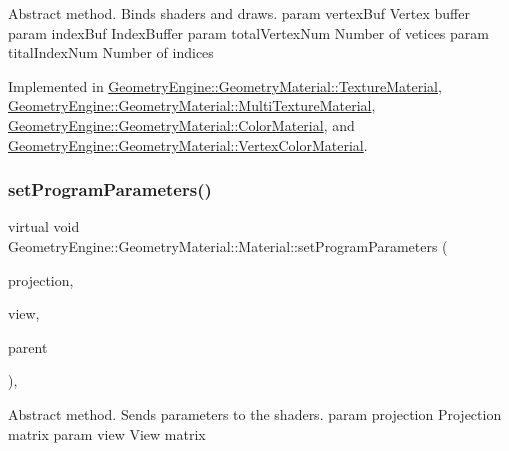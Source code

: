 Abstract method. Binds shaders and draws. param vertex\+Buf Vertex buffer param index\+Buf Index\+Buffer param total\+Vertex\+Num Number of vetices param tital\+Index\+Num Number of indices 

Implemented in \mbox{\hyperlink{class_geometry_engine_1_1_geometry_material_1_1_texture_material_a7bb3c956fa64e47b251d882890c931f9}{Geometry\+Engine\+::\+Geometry\+Material\+::\+Texture\+Material}}, \mbox{\hyperlink{class_geometry_engine_1_1_geometry_material_1_1_multi_texture_material_af6edaa5960d07b6abee870760e869189}{Geometry\+Engine\+::\+Geometry\+Material\+::\+Multi\+Texture\+Material}}, \mbox{\hyperlink{class_geometry_engine_1_1_geometry_material_1_1_color_material_abaf6f7ed79dad79253ea469c4c7460eb}{Geometry\+Engine\+::\+Geometry\+Material\+::\+Color\+Material}}, and \mbox{\hyperlink{class_geometry_engine_1_1_geometry_material_1_1_vertex_color_material_af03191da84c84c45af91405f3cba3b5d}{Geometry\+Engine\+::\+Geometry\+Material\+::\+Vertex\+Color\+Material}}.

\mbox{\label{class_geometry_engine_1_1_geometry_material_1_1_material_a68310797df53062f237d0005fbcfce7e}} 
\subsubsection{\texorpdfstring{setProgramParameters()}{setProgramParameters()}}
{\footnotesize\ttfamily virtual void Geometry\+Engine\+::\+Geometry\+Material\+::\+Material\+::set\+Program\+Parameters (\begin{DoxyParamCaption}\item[{const Q\+Matrix4x4 \&}]{projection,  }\item[{const Q\+Matrix4x4 \&}]{view,  }\item[{const \mbox{\hyperlink{class_geometry_engine_1_1_geometry_world_item_1_1_geometry_item_1_1_geometry_item}{Geometry\+World\+Item\+::\+Geometry\+Item\+::\+Geometry\+Item}} \&}]{parent }\end{DoxyParamCaption})\hspace{0.3cm}{\ttfamily [protected]}, {}}

Abstract method. Sends parameters to the shaders. param projection Projection matrix param view View matrix

